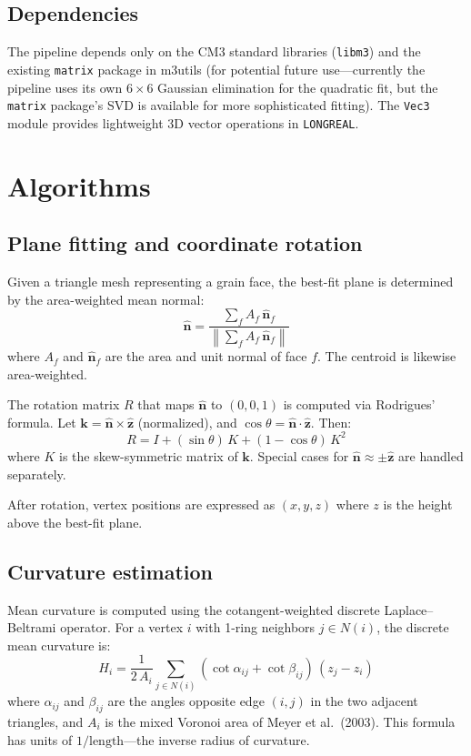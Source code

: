 \documentclass[11pt]{article}
\begin{document}
\subsection{Dependencies}

The pipeline depends only on the CM3 standard libraries
(\texttt{libm3}) and the existing \texttt{matrix} package in
m3utils (for potential future use---currently the pipeline uses its
own $6 \times 6$ Gaussian elimination for the quadratic fit, but
the \texttt{matrix} package's SVD is available for more
sophisticated fitting).  The \texttt{Vec3} module provides
lightweight 3D vector operations in \texttt{LONGREAL}.

\section{Algorithms}

\subsection{Plane fitting and coordinate rotation}

Given a triangle mesh representing a grain face, the best-fit plane
is determined by the area-weighted mean normal:
\[
  \hat{\mathbf{n}} = \frac{\sum_f A_f \,\hat{\mathbf{n}}_f}
    {\left\|\sum_f A_f \,\hat{\mathbf{n}}_f\right\|}
\]
where $A_f$ and $\hat{\mathbf{n}}_f$ are the area and unit normal
of face $f$.  The centroid is likewise area-weighted.

The rotation matrix $R$ that maps $\hat{\mathbf{n}}$ to
$(0,0,1)$ is computed via Rodrigues' formula.  Let
$\mathbf{k} = \hat{\mathbf{n}} \times \hat{\mathbf{z}}$
(normalized), and $\cos\theta = \hat{\mathbf{n}} \cdot
\hat{\mathbf{z}}$.  Then:
\[
  R = I + (\sin\theta)\,K + (1 - \cos\theta)\,K^2
\]
where $K$ is the skew-symmetric matrix of $\mathbf{k}$.  Special
cases for $\hat{\mathbf{n}} \approx \pm\hat{\mathbf{z}}$ are
handled separately.

After rotation, vertex positions are expressed as $(x, y, z)$ where
$z$ is the height above the best-fit plane.

\subsection{Curvature estimation}
\label{sec:curvature}

Mean curvature is computed using the cotangent-weighted discrete
Laplace--Beltrami operator.  For a vertex $i$ with 1-ring neighbors
$j \in N(i)$, the discrete mean curvature is:
\[
  H_i = \frac{1}{2\,A_i} \sum_{j \in N(i)}
    (\cot\alpha_{ij} + \cot\beta_{ij})\,(z_j - z_i)
\]
where $\alpha_{ij}$ and $\beta_{ij}$ are the angles opposite edge
$(i,j)$ in the two adjacent triangles, and $A_i$ is the mixed Voronoi area of Meyer et al.\ (2003).  This formula has units of $1/\text{length}$---the
inverse radius of curvature.
\end{document}
